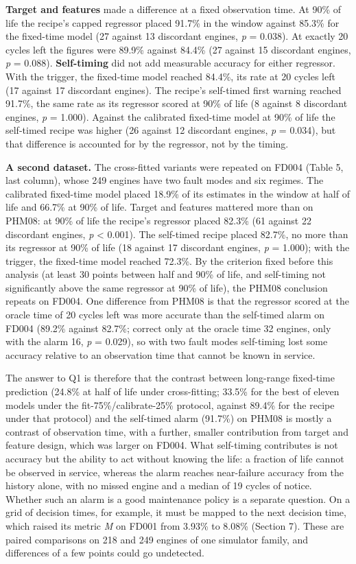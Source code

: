 \documentclass[a4paper,fleqn,doubleblind]{cas-dc}
\begin{document}
\textbf{Target and features} made a difference at a fixed observation time. At 90\% of life the recipe's capped regressor placed 91.7\% in the window against 85.3\% for the fixed-time model (27 against 13 discordant engines, \textit{p} = 0.038). At exactly 20 cycles left the figures were 89.9\% against 84.4\% (27 against 15 discordant engines, \textit{p} = 0.088). \textbf{Self-timing} did not add measurable accuracy for either regressor. With the trigger, the fixed-time model reached 84.4\%, its rate at 20 cycles left (17 against 17 discordant engines). The recipe's self-timed first warning reached 91.7\%, the same rate as its regressor scored at 90\% of life (8 against 8 discordant engines, \textit{p} = 1.000). Against the calibrated fixed-time model at 90\% of life the self-timed recipe was higher (26 against 12 discordant engines, \textit{p} = 0.034), but that difference is accounted for by the regressor, not by the timing.

\textbf{A second dataset.} The cross-fitted variants were repeated on FD004 (Table 5, last column), whose 249 engines have two fault modes and six regimes. The calibrated fixed-time model placed 18.9\% of its estimates in the window at half of life and 66.7\% at 90\% of life. Target and features mattered more than on PHM08: at 90\% of life the recipe's regressor placed 82.3\% (61 against 22 discordant engines, \textit{p} < 0.001). The self-timed recipe placed 82.7\%, no more than its regressor at 90\% of life (18 against 17 discordant engines, \textit{p} = 1.000); with the trigger, the fixed-time model reached 72.3\%. By the criterion fixed before this analysis (at least 30 points between half and 90\% of life, and self-timing not significantly above the same regressor at 90\% of life), the PHM08 conclusion repeats on FD004. One difference from PHM08 is that the regressor scored at the oracle time of 20 cycles left was more accurate than the self-timed alarm on FD004 (89.2\% against 82.7\%; correct only at the oracle time 32 engines, only with the alarm 16, \textit{p} = 0.029), so with two fault modes self-timing lost some accuracy relative to an observation time that cannot be known in service.

The answer to Q1 is therefore that the contrast between long-range fixed-time prediction (24.8\% at half of life under cross-fitting; 33.5\% for the best of eleven models under the fit-75\%/calibrate-25\% protocol, against 89.4\% for the recipe under that protocol) and the self-timed alarm (91.7\%) on PHM08 is mostly a contrast of observation time, with a further, smaller contribution from target and feature design, which was larger on FD004. What self-timing contributes is not accuracy but the ability to act without knowing the life: a fraction of life cannot be observed in service, whereas the alarm reaches near-failure accuracy from the history alone, with no missed engine and a median of 19 cycles of notice. Whether such an alarm is a good maintenance policy is a separate question. On a grid of decision times, for example, it must be mapped to the next decision time, which raised its metric \textit{M} on FD001 from 3.93\% to 8.08\% (Section 7). These are paired comparisons on 218 and 249 engines of one simulator family, and differences of a few points could go undetected.
\end{document}
